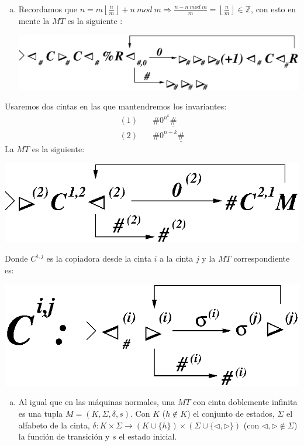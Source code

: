 \documentclass[dcc]{fcfmcourse}
\begin{document}
\begin{problems}
\begin{enumerate}[a)]
\begin{center}
    \end{center}
    \item 
    Recordamos que $n = m\left \lfloor \frac{n}{m} \right\rfloor + n\ mod\ m \Rightarrow \frac{n - n\ mod\ m}{m} = \left \lfloor \frac{n}{m} \right\rfloor \in \mathbb{Z}$, con esto en mente la $MT$ es la siguiente : %
    \begin{center}
    \includegraphics[scale=0.8]{P02c.eps}
    \end{center}
\end{enumerate}
\problem Usaremos dos cintas en las que mantendremos los invariantes:
\begin{align*}
    (1) &\quad \#0^{n^{\underline{k}}}\underline{\#}\\
    (2) &\quad \#0^{n-k}\underline{\#}
\end{align*}
La $MT$ es la siguiente:
\begin{center}
\includegraphics[scale=0.8]{P1.eps}
\end{center}
\newpage
Donde $C^{i,j}$ es la copiadora desde la cinta $i$ a la cinta $j$ y la $MT$ correspondiente es:
\begin{center}
\includegraphics[scale=0.8]{P11.eps}
\end{center}
\problem 
\begin{enumerate}[a)]
    \item Al igual que en las máquinas normales, una $MT$ con cinta doblemente infinita es una tupla $M = (K,\Sigma,\delta,s)$. Con $K$ ($h\not\in K$) el conjunto de estados, $\Sigma$ el alfabeto de la cinta, $\delta\colon K \times \Sigma \to \left(K\cup \{h\}\right)\times \left(\Sigma \cup \{\triangleleft, \triangleright\}\right)$ (con $\triangleleft,\triangleright \not\in\Sigma$) la función de transición y $s$ el estado inicial.\\
    

\end{enumerate}
\end{problems}
\end{document}

